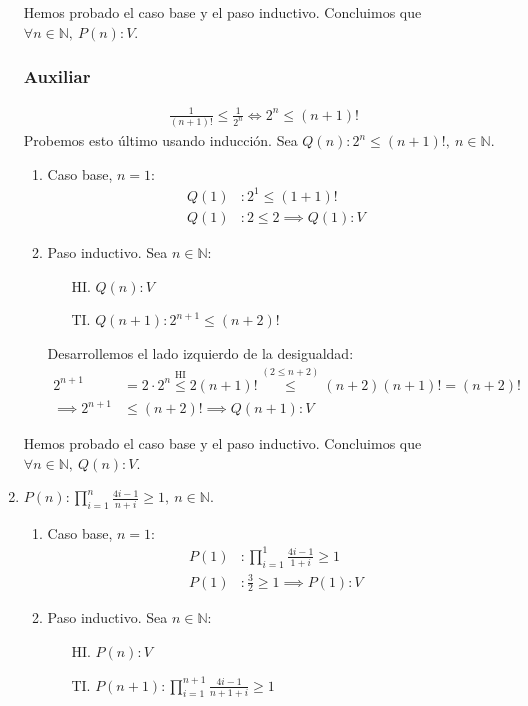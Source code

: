 \begin{enumerate}[label=\roman*)]
    Hemos probado el caso base y el paso inductivo. Concluimos que $\forall n \in \mathbb{N}, \ P(n): V$.
    
    \subsubsection*{Auxiliar}
    \begin{align*}
        \frac{1}{(n+1)!} \leq \frac{1}{2^n} \Longleftrightarrow 2^n \leq (n+1)!
    \end{align*}
    Probemos esto último usando inducción. Sea $Q(n): 2^n \leq (n+1)!, \ n \in \mathbb{N}$.

    \begin{enumerate}[label=\arabic*)]
        \item Caso base, $n = 1$:
        \begin{align*}
            Q(1)&: 2^1 \leq (1+1)! \\
            Q(1)&: 2 \leq 2 \implies Q(1):V
        \end{align*}
        \item Paso inductivo. Sea $n \in \mathbb{N}$:
        \begin{enumerate}
            \item[HI.] $Q(n): V$
            \item[TI.] $Q(n+1): 2^{n+1} \leq (n+2)! $ 
        \end{enumerate}

        Desarrollemos el lado izquierdo de la desigualdad:
        \begin{align*}
            2^{n+1} &= 2 \cdot 2^n \overset{\text{HI}}{\leq} 2 (n+1)! \overset{(2\leq n+2)}{\leq} (n+2)(n+1)! = (n+2)! \\
            \implies 2^{n+1} &\leq (n+2)! \implies Q(n+1):V
        \end{align*}
    \end{enumerate}
    
    Hemos probado el caso base y el paso inductivo. Concluimos que $\forall n \in \mathbb{N}, \ Q(n): V$.
    

    \item $P(n): \displaystyle \prod_{i=1}^{n}\frac{4i-1}{n+i} \geq 1, \ n \in \mathbb{N}$.
    \begin{enumerate}[label=\arabic*)]
        \item Caso base, $n = 1$:
        \begin{align*}
            P(1)&: \prod_{i=1}^{1}\frac{4i-1}{1+i} \geq 1 \\
            P(1)&: \frac{3}{2} \geq 1 \implies P(1): V
        \end{align*} 
        \item Paso inductivo. Sea $n \in \mathbb{N}$:
        \begin{enumerate}
            \item[HI.] $P(n): V$
            \item[TI.] $P(n+1): \displaystyle \prod_{i=1}^{n+1}\frac{4i-1}{n+1+i} \geq 1 $ 
        \end{enumerate}


\end{enumerate}
\end{enumerate}
